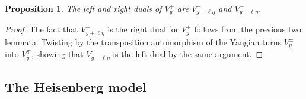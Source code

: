 \documentclass[11pt]{report}
\newtheorem{prop}[theorem]{Proposition}
\theoremstyle{definition}
\theoremstyle{remark}
\theoremstyle{remark}
\begin{document}
\begin{prop}
The left and right duals of $V_y^+$ are $V_{y-\ell\eta}^-$ and $V_{y+\ell\eta}^-$.
\end{prop}

\begin{proof}
The fact that $V_{y+\ell\eta}^-$ is the right dual for $V_y^+$ follows from the previous two lemmata. Twisting by the transposition automorphism of the Yangian turns $V_y^\pm$ into $V_y^\mp$, showing that $V_{y-\ell\eta}^-$ is the left dual by the same argument.
\end{proof}

\subsection{The Heisenberg model}
\end{document}
